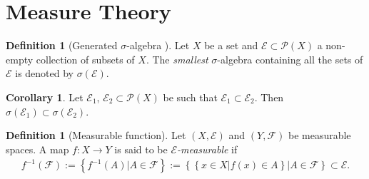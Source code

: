 \documentclass[12pt, a4paper]{article}
\numberwithin{equation}{section}
\theoremstyle{definition}
\theoremstyle{definition}
\newtheorem{defn}[thm]{Definition} %
\newtheorem{corollary}[thm]{Corollary}
\begin{document}
	\newpage
	
	\section{Measure Theory}
	\begin{defn}[Generated $\sigma$-algebra \cite{generated-sigma-algebras}]
		Let $X$ be a set and $\mathcal E\subset \mathcal P(X)$ a non-empty collection of subsets of $X$. The \textit{smallest} $\sigma$-algebra containing all the sets of $\mathcal E$ is denoted by $\sigma(\mathcal E)$. 
	\end{defn}

	\begin{corollary}
		Let $\mathcal E_1$, $\mathcal E_2\subset \mathcal P(X)$ be such that $\mathcal E_1 \subset \mathcal E_2$. Then $\sigma(\mathcal E_1) \subset \sigma(\mathcal E_2)$.    
	\end{corollary}
	
	\begin{defn}[Measurable function]
		Let $(X, \mathcal E)$ and $(Y, \mathcal F)$ be measurable spaces. A map $f: X\rightarrow Y$ is said to be \textit{$\mathcal E$-measurable} if 
		\begin{align} \label{measurable-mapping-eq}
			f^{-1}(\mathcal F) := \left\{ f^{-1}(A) \vert A\in \mathcal F \right\} := \left\{ \left\{ x\in X \vert f(x) \in A \right\} \vert A\in \mathcal F \right\} \subset \mathcal E.
		\end{align} 
	\end{defn}
\end{document}
